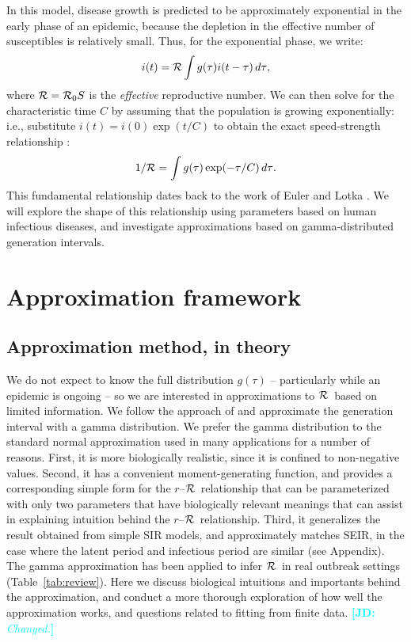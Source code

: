 \documentclass[12pt]{article}
\newcommand{\rR}{\mbox{$r$--$\cal R$}}
\newcommand{\RR}{\ensuremath{{\cal R}}}
\newcommand{\Rx}[1]{\ensuremath{{\cal R}_{#1}}}
\newcommand{\Ro}{\Rx{0}}
\newcommand{\Tc}{\ensuremath{C}}
\newcommand{\tref}[1]{Table~\ref{tab:#1}}
\newcommand{\comment}[3]{\textcolor{#1}{\textbf{[#2: }\textsl{#3}\textbf{]}}}
\newcommand{\jd}[1]{\comment{cyan}{JD}{#1}}
\begin{document}
In this model, disease growth is predicted to be approximately exponential in the early phase of an epidemic, because the depletion in the effective number of susceptibles is relatively small.
Thus, for the exponential phase, we write:
\begin{equation}
i(t) = \RR\int{g(\tau)i(t-\tau) \,d\tau},
\end{equation}
where $\RR = \Ro S$ is the \emph{effective} reproductive number.
We can then solve for the characteristic time $\Tc$ by assuming that the population is growing exponentially: i.e., substitute $i(t) = i(0) \exp(t/\Tc)$ to obtain the exact speed-strength relationship \cite{diekmann2000mathematical}:
\begin{equation}
	1/\RR = \int{g(\tau)\exp(-\tau/\Tc) \,d\tau}.\label{eq:Euler}
\end{equation}
This fundamental relationship dates back to the work of Euler and Lotka \cite{Lotka}. We will explore the shape of this relationship using parameters based on human infectious diseases, and investigate approximations based on gamma-distributed generation intervals.

\section{Approximation framework}
\label{approxframe}

\subsection{Approximation method, in theory}
We do not expect to know the full distribution $g(\tau)$ -- particularly while an epidemic is ongoing -- so we are interested in approximations to \RR\ based on limited information.
We follow the approach of \cite{NishCast09} and approximate the generation interval with a gamma distribution.
We prefer the gamma distribution to the standard normal approximation used in many applications for a number of reasons.
First, it is more biologically realistic, since it is confined to non-negative values.
Second, it has a convenient moment-generating function, and provides a corresponding simple form for the \rR\ relationship that can be parameterized with only two parameters that have biologically relevant meanings that can assist in explaining intuition behind the \rR\ relationship.
Third, it generalizes the result obtained from simple SIR models, and approximately matches SEIR, in the case where the latent period and infectious period are similar (see Appendix).
The gamma approximation has been applied to infer \RR\ in real outbreak settings (\tref{review}). Here we discuss biological intuitions and importants behind the approximation, and conduct a more thorough exploration of how well the approximation works, and questions related to fitting from finite data. 
\jd{Changed.}
\end{document}
